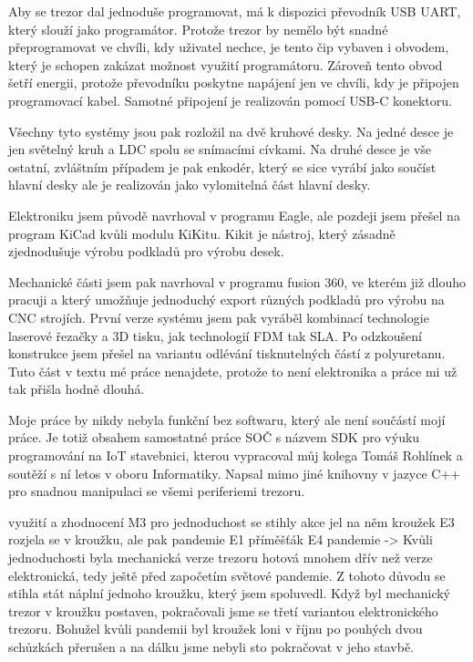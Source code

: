     Aby se trezor dal jednoduše programovat, má k dispozici převodník USB UART, který slouží jako programátor.
    Protože trezor by nemělo být snadné přeprogramovat ve chvíli, kdy uživatel nechce, je tento čip vybaven 
    i obvodem, který je schopen zakázat možnost využití programátoru. Zároveň tento obvod šetří energii, protože 
    převodníku poskytne napájení jen ve chvíli, kdy je připojen programovací kabel. 
    Samotné připojení je realizován pomocí USB-C konektoru.

    Všechny tyto systémy jsou pak rozložil na dvě kruhové desky.
    Na jedné desce je jen světelný kruh a LDC spolu se snímacími cívkami.
    Na druhé desce je vše ostatní, zvláštním případem je pak enkodér, 
    který se sice vyrábí jako součíst hlavní desky ale je realizován jako vylomitelná část hlavní desky. %

    Elektroniku jsem původě navrhoval v programu Eagle, ale pozdeji jsem přešel na program KiCad kvůli modulu KiKitu. 
    Kikit je nástroj, který zásadně zjednodušuje výrobu podkladů pro výrobu desek. 
    

    Mechanické části jsem pak navrhoval v programu fusion 360, ve kterém již dlouho pracuji a který umožňuje jednoduchý 
    export různých podkladů pro výrobu na CNC strojích.
    První verze systému jsem pak vyráběl kombinací technologie laserové řezačky a 3D tisku, jak technologií FDM tak SLA.
    Po odzkoušení konstrukce jsem přešel na variantu odlévání tisknutelných částí z polyuretanu. 
    Tuto část v textu mé práce nenajdete, protože
    to není elektronika a práce mi už tak přišla hodně dlouhá.

    Moje práce by nikdy nebyla funkční bez softwaru, který ale není součástí mojí práce. Je totiž obsahem samostatné práce SOČ
    s názvem SDK pro výuku programování na IoT stavebnici, %
    kterou vypracoval můj kolega Tomáš Rohlínek a soutěží s ní letos v oboru Informatiky.
    Napsal mimo jiné knihovny v jazyce C++ pro snadnou manipulaci se všemi periferiemi trezoru.

využití a zhodnocení
{
    M3
        pro jednoduchost se stihly akce
        jel na něm kroužek
    E3
        rozjela se v kroužku, ale pak pandemie
    E1
        příměšťák
    E4
        pandemie
}-> Kvůli jednoduchosti byla mechanická verze trezoru hotová mnohem dřív než verze elektronická, tedy ještě před započetím světové pandemie.
    Z tohoto důvodu se stihla stát náplní jednoho kroužku, který jsem spoluvedl. Když byl mechanický trezor v kroužku postaven,
     pokračovali jsme se třetí variantou elektronického 
    trezoru. Bohužel kvůli pandemii byl kroužek loni v říjnu po pouhých dvou schůzkách přerušen 
    a na dálku jsme nebyli sto pokračovat v jeho stavbě.

